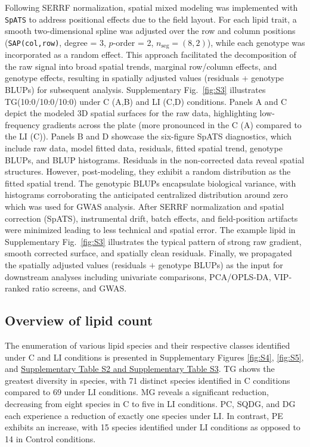 \documentclass[10pt,letterpaper]{article}
\begin{document}
\begin{itemize}
Following SERRF normalization, spatial mixed modeling was implemented with \texttt{SpATS} to address positional effects due to the field layout. For each lipid trait, a smooth two-dimensional spline was adjusted over the row and column positions (\texttt{SAP(col,row)}, degree = 3, $p$-order = 2, $n_{\mathrm{seg}}=(8,2)$), while each genotype was incorporated as a random effect. This approach facilitated the decomposition of the raw signal into broad spatial trends, marginal row/column effects, and genotype effects, resulting in spatially adjusted values (residuals + genotype BLUPs) for subsequent analysis. Supplementary Fig.~\ref{fig:S3} illustrates TG(10:0/10:0/10:0) under C (A,B) and LI (C,D) conditions. Panels A and C depict the modeled 3D spatial surfaces for the raw data, highlighting low-frequency gradients across the plate (more pronounced in the C (A) compared to the LI (C)). Panels B and D showcase the six-figure SpATS diagnostics, which include raw data, model fitted data, residuals, fitted spatial trend, genotype BLUPs, and BLUP histograms. Residuals in the non-corrected data reveal spatial structures. However, post-modeling, they exhibit a random distribution as the fitted spatial trend. The genotypic BLUPs encapsulate biological variance, with histograms corroborating the anticipated centralized distribution around zero which was used for GWAS analysis. After SERRF normalization and spatial correction (SpATS), instrumental drift, batch effects, and field-position artifacts were minimized leading to less technical and spatial error. The example lipid in Supplementary Fig.~\ref{fig:S3} illustrates the typical pattern of strong raw gradient, smooth corrected surface, and spatially clean residuals. Finally, we propagated the spatially adjusted values (residuals $+$ genotype BLUPs) as the input for downstream analyses including univariate comparisons, PCA/OPLS‐DA, VIP‐ranked ratio screens, and GWAS. 

\subsection*{Overview of lipid count}
The enumeration of various lipid species and their respective classes identified under C and LI conditions is presented in Supplementary Figures \ref{fig:S4}, \ref{fig:S5}, and \href{https://docs.google.com/spreadsheets/d/1SB90-QLYheKEzmHCUIh1UfgkrtbL064s8Oo5BfwFaV0/edit?gid=0#gid=0}{Supplementary Table S2 and Supplementary Table S3}. TG shows the greatest diversity in species, with 71 distinct species identified in C conditions compared to 69 under LI conditions. MG reveals a significant reduction, decreasing from eight species in C to five in LI conditions. PC, SQDG, and DG each experience a reduction of exactly one species under LI. In contrast, PE exhibits an increase, with 15 species identified under LI conditions as opposed to 14 in Control conditions.


\end{itemize}
\end{document}
